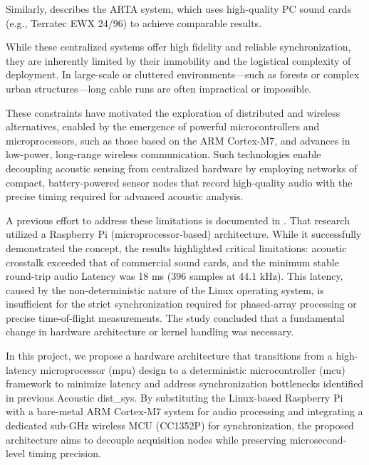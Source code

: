 Similarly, \cite{Mateljan2003CompIR} describes the ARTA system, which uses high-quality PC sound cards (e.g., Terratec EWX 24/96) to achieve comparable results.

While these centralized systems offer high fidelity and reliable synchronization, they are inherently limited by their immobility and the logistical complexity of deployment. In large-scale or cluttered environments—such as forests or complex urban structures—long cable runs are often impractical or impossible.

These constraints have motivated the exploration of distributed and wireless alternatives, enabled by the emergence of powerful microcontrollers and microprocessors, such as those based on the ARM Cortex-M7, and advances in low-power, long-range wireless communication. Such technologies enable decoupling acoustic sensing from centralized hardware by employing networks of compact, battery-powered sensor nodes that record high-quality audio with the precise timing required for advanced acoustic analysis.

A previous effort to address these limitations is documented in \cite{IRThesisAndres}. That research utilized a Raspberry Pi (microprocessor-based) architecture. While it successfully demonstrated the concept, the results highlighted critical limitations: acoustic crosstalk exceeded that of commercial sound cards, and the minimum stable round-trip audio \gls{Latency} was 18 ms (396 samples at 44.1 kHz). This latency, caused by the non-deterministic nature of the Linux operating system, is insufficient for the strict synchronization required for phased-array processing or precise time-of-flight measurements. The study concluded that a fundamental change in hardware architecture or kernel handling was necessary.

In this project, we propose a hardware architecture that transitions from a high-latency microprocessor (\acrshort{mpu}) design to a deterministic microcontroller (\acrshort{mcu}) framework to minimize latency and address synchronization bottlenecks identified in previous Acoustic \gls{dist_sys}. By substituting the Linux-based Raspberry Pi with a bare-metal ARM Cortex-M7 system for audio processing and integrating a dedicated sub-GHz wireless MCU (CC1352P) for synchronization, the proposed architecture aims to decouple acquisition nodes while preserving microsecond-level timing precision.

